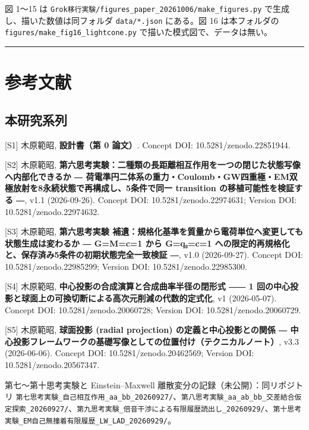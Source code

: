 \documentclass[
  a4paper,
]{ltjsarticle}
\begin{document}
図 1〜15 は
\texttt{Grok移行実験/figures\_paper\_20261006/make\_figures.py}
で生成し、描いた数値は同フォルダ \texttt{data/*.json} にある。図 16
は本フォルダの \texttt{figures/make\_fig16\_lightcone.py}
で描いた模式図で、データは無い。

\begin{center}\rule{0.5\linewidth}{0.5pt}\end{center}

\section{参考文献}\label{ux53c2ux8003ux6587ux732e}

\subsection{本研究系列}\label{ux672cux7814ux7a76ux7cfbux5217}

{[}S1{]} 木原範昭, \textbf{設計書（第 0 論文）}. Concept DOI:
10.5281/zenodo.22851944.

{[}S2{]} 木原範昭,
\textbf{第六思考実験：二種類の長距離相互作用を一つの閉じた状態写像へ内部化できるか
―
荷電準円二体系の重力・Coulomb・GW四重極・EM双極放射を8永続状態で再構成し、5条件で同一
transition の移植可能性を検証する ―}, v1.1 (2026-09-26). Concept DOI:
10.5281/zenodo.22974631; Version DOI: 10.5281/zenodo.22974632.

{[}S3{]} 木原範昭, \textbf{第六思考実験
補遺：規格化基準を質量から電荷単位へ変更しても状態生成は変わるか ―
G=M=c=1 から G=q₀=c=1
への限定的再規格化と、保存済み5条件の初期状態完全一致検証 ―}, v1.0
(2026-09-27). Concept DOI: 10.5281/zenodo.22985299; Version DOI:
10.5281/zenodo.22985300.

{[}S4{]} 木原範昭, \textbf{中心投影の合成演算と合成曲率半径の閉形式 ―― 1
回の中心投影と球面上の可換切断による高次元削減の代数的定式化}, v1
(2026-05-07). Concept DOI: 10.5281/zenodo.20060728; Version DOI:
10.5281/zenodo.20060729.

{[}S5{]} 木原範昭, \textbf{球面投影 (radial projection)
の定義と中心投影との関係 ―
中心投影フレームワークの基礎写像としての位置付け（テクニカルノート）},
v3.3 (2026-06-06). Concept DOI: 10.5281/zenodo.20462569; Version DOI:
10.5281/zenodo.20567347.

第七〜第十思考実験と Einstein--Maxwell
離散変分の記録（未公開）：同リポジトリ
\texttt{第七思考実験\_自己相互作用\_aa\_bb\_20260927/}、\texttt{第八思考実験\_aa\_ab\_bb\_交差結合仮定探索\_20260927/}、\texttt{第九思考実験\_倍音干渉による有限履歴読出し\_20260929/}、\texttt{第十思考実験\_EM自己無撞着有限履歴\_LW\_LAD\_20260929/}。
\end{document}
